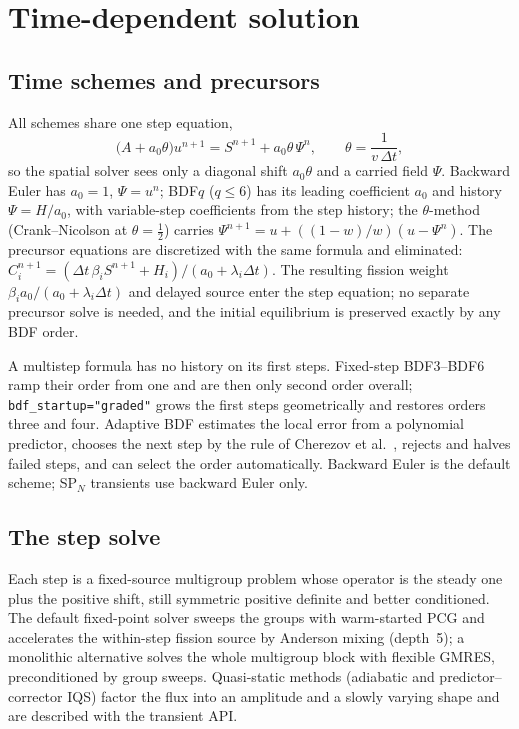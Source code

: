 \documentclass[a4paper,10pt]{article}
\newcommand{\code}[1]{\texttt{#1}}
\begin{document}
\section{Time-dependent solution}
\label{sec:transient}

\subsection{Time schemes and precursors}

All schemes share one step equation,
\begin{equation}
\bigl(A + a_0\theta\bigr)u^{n+1} = S^{n+1} + a_0\theta\,\Psi^n,\qquad
\theta = \frac{1}{v\,\Delta t},
\end{equation}
so the spatial solver sees only a diagonal shift $a_0\theta$ and a carried field
$\Psi$. Backward Euler has $a_0 = 1$, $\Psi = u^n$; BDF$q$ ($q\le6$) has its
leading coefficient $a_0$ and history $\Psi = H/a_0$, with variable-step
coefficients from the step history; the $\theta$-method (Crank--Nicolson at
$\theta = \frac12$) carries $\Psi^{n+1} = u + ((1-w)/w)(u-\Psi^n)$. The precursor
equations are discretized with the same formula and eliminated:
$C_i^{n+1} = (\Delta t\,\beta_iS^{n+1} + H_i)/(a_0 + \lambda_i\Delta t)$. The
resulting fission weight $\beta_ia_0/(a_0+\lambda_i\Delta t)$ and delayed source
enter the step equation; no separate precursor solve is needed, and the initial
equilibrium is preserved exactly by any BDF order.

A multistep formula has no history on its first steps. Fixed-step BDF3--BDF6 ramp
their order from one and are then only second order overall;
\code{bdf\_startup="graded"} grows the first steps geometrically and restores
orders three and four. Adaptive BDF estimates the local error from a polynomial
predictor, chooses the next step by the rule of Cherezov et
al.~\cite{cherezov2025}, rejects and halves failed steps, and can select the order
automatically. Backward Euler is the default scheme; SP$_N$ transients use
backward Euler only.

\subsection{The step solve}

Each step is a fixed-source multigroup problem whose operator is the steady one
plus the positive shift, still symmetric positive definite and better conditioned.
The default fixed-point solver sweeps the groups with warm-started PCG and
accelerates the within-step fission source by Anderson mixing (depth~5); a
monolithic alternative solves the whole multigroup block with flexible GMRES,
preconditioned by group sweeps. Quasi-static methods (adiabatic and
predictor--corrector IQS) factor the flux into an amplitude and a slowly varying
shape and are described with the transient API.
\end{document}
